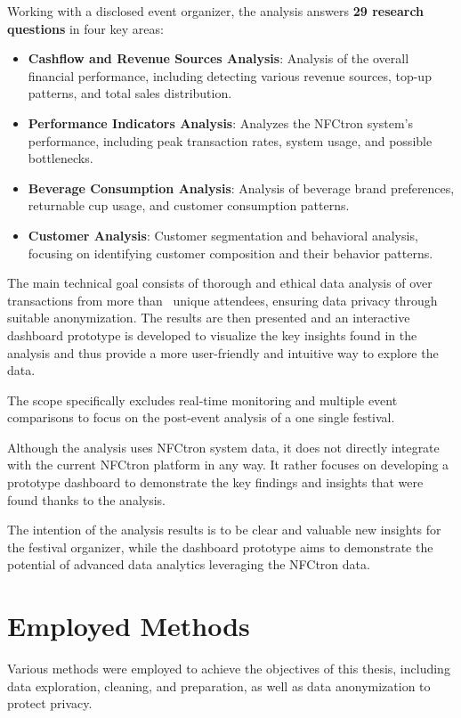Working with a disclosed event organizer, the analysis answers \textbf{29 research questions} in four key areas:\\
\begin{itemize}
	\item \textbf{Cashflow and Revenue Sources Analysis}: Analysis of the overall financial performance, including detecting various revenue sources, top-up patterns, and total sales distribution.
	\item \textbf{Performance Indicators Analysis}: Analyzes the NFCtron system's performance, including peak transaction rates, system usage, and possible bottlenecks.
	\item \textbf{Beverage Consumption Analysis}: Analysis of beverage brand preferences, returnable cup usage, and customer consumption patterns.
	\item \textbf{Customer Analysis}: Customer segmentation and behavioral analysis, focusing on identifying customer composition and their behavior patterns.
\end{itemize}

The main technical goal consists of thorough and ethical data analysis of over~ transactions from more than~ unique attendees, ensuring data privacy through suitable anonymization.
The results are then presented and an interactive dashboard prototype is developed to visualize the key insights found in the analysis and thus provide a more user-friendly and intuitive way to explore the data.

The scope specifically excludes real-time monitoring and multiple event comparisons to focus on the post-event analysis of a one single festival.

Although the analysis uses NFCtron system data, it does not directly integrate with the current NFCtron platform in any way.
It rather focuses on developing a prototype dashboard to demonstrate the key findings and insights that were found thanks to the analysis.

The intention of the analysis results is to be clear and valuable new insights for the festival organizer, while the dashboard prototype aims to demonstrate the potential of advanced data analytics leveraging the NFCtron data.

\section*{Employed Methods}
\label{sec:employed-methods}
Various methods were employed to achieve the objectives of this thesis, including data exploration, cleaning, and preparation, as well as data anonymization to protect privacy.


